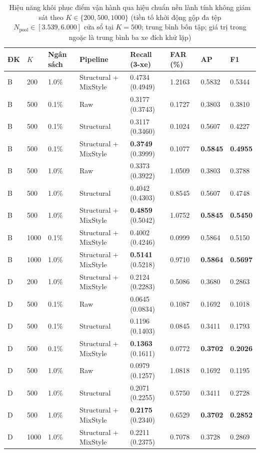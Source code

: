 \documentclass[12pt, a4paper, reqno, oneside]{book}
\begin{document}
{\renewcommand{\arraystretch}{0.84}
\begin{table}[htbp]\centering\footnotesize\setlength{\tabcolsep}{4pt}
\caption[Hiệu năng hiệu chuẩn nền lành tính theo ngân sách khởi động $K$]{Hiệu năng khôi phục điểm vận hành qua hiệu chuẩn nền lành tính không giám sát theo $K \in \{200, 500, 1000\}$ (tiền tố khởi động gộp đa tệp $N_{\text{pool}} \in [3.539, 6.000]$ cửa sổ tại $K=500$; trung bình bốn tập; giá trị trong ngoặc là trung bình ba xe đích khử lặp)}\label{tab:benign-calibration-summary}
\begin{tabular}{P{0.7cm}P{0.9cm}P{1.7cm}P{3.1cm}P{2.2cm}P{1.4cm}P{1.2cm}P{1.2cm}}
\toprule
ĐK & $K$ & Ngân sách & Pipeline & Recall (3-xe) & FAR (\%) & AP & F1\\\midrule
B & 200 & 1.0\% & Structural + MixStyle & 0.4734 (0.4949) & 1.2163 & 0.5832 & 0.5344\\
B & 500 & 0.1\% & Raw & 0.3177 (0.3743) & 0.1727 & 0.3803 & 0.3810\\
B & 500 & 0.1\% & Structural & 0.3117 (0.3460) & 0.1024 & 0.5607 & 0.4227\\
B & 500 & 0.1\% & Structural + MixStyle & \textbf{0.3749} (0.3999) & 0.1077 & \textbf{0.5845} & \textbf{0.4955}\\
B & 500 & 1.0\% & Raw & 0.3373 (0.3922) & 1.0509 & 0.3803 & 0.3788\\
B & 500 & 1.0\% & Structural & 0.4042 (0.4303) & 0.8545 & 0.5607 & 0.4748\\
B & 500 & 1.0\% & Structural + MixStyle & \textbf{0.4859} (0.5042) & 1.0752 & \textbf{0.5845} & \textbf{0.5450}\\
B & 1000 & 0.1\% & Structural + MixStyle & 0.4002 (0.4246) & 0.0999 & 0.5864 & 0.5150\\
B & 1000 & 1.0\% & Structural + MixStyle & \textbf{0.5141} (0.5218) & 0.9710 & \textbf{0.5864} & \textbf{0.5697}\\
\midrule
D & 200 & 1.0\% & Structural + MixStyle & 0.2124 (0.2283) & 0.5086 & 0.3680 & 0.2863\\
D & 500 & 0.1\% & Raw & 0.0645 (0.0834) & 0.1087 & 0.1692 & 0.1018\\
D & 500 & 0.1\% & Structural & 0.1196 (0.1403) & 0.0845 & 0.3411 & 0.1793\\
D & 500 & 0.1\% & Structural + MixStyle & \textbf{0.1363} (0.1611) & 0.0772 & \textbf{0.3702} & \textbf{0.2026}\\
D & 500 & 1.0\% & Raw & 0.0979 (0.1257) & 1.0818 & 0.1692 & 0.1195\\
D & 500 & 1.0\% & Structural & 0.2071 (0.2255) & 0.5750 & 0.3411 & 0.2728\\
D & 500 & 1.0\% & Structural + MixStyle & \textbf{0.2175} (0.2340) & 0.6529 & \textbf{0.3702} & \textbf{0.2852}\\
D & 1000 & 1.0\% & Structural + MixStyle & 0.2211 (0.2375) & 0.7078 & 0.3728 & 0.2869\\
\bottomrule\end{tabular}
\end{table}}
\end{document}
